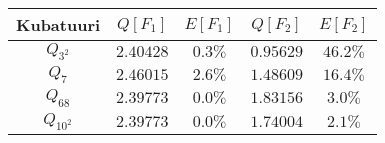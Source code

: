 \begin{tabular}{ccccc}
\toprule
Kubatuuri&$Q[F_1]$&$E[F_1]$&$Q[F_2]$&$E[F_2]$\\\midrule
$Q_{3^2}$&$2.40428$&$0.3\%$&$0.95629$&$46.2\%$\\
$Q_{7}$&$2.46015$&$2.6\%$&$1.48609$&$16.4\%$\\
$Q_{68}$&$2.39773$&$0.0\%$&$1.83156$&$3.0\%$\\
$Q_{10^2}$&$2.39773$&$0.0\%$&$1.74004$&$2.1\%$\\
\bottomrule
\end{tabular}

